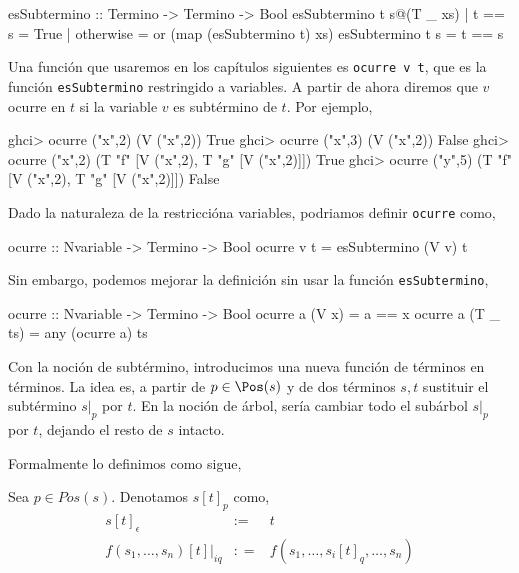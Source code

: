 \begin{codigo}
esSubtermino :: Termino -> Termino -> Bool
esSubtermino t s@(T _ xs)
    | t == s = True
    | otherwise = or (map (esSubtermino t) xs)
esSubtermino t s = t == s
\end{codigo}

Una función que usaremos en los capítulos siguientes es
\texttt{ocurre v t}, que es la función \texttt{esSubtermino}
restringido a variables. A partir de ahora diremos que $v$ ocurre en
$t$ si la variable $v$ es subtérmino de $t$. Por ejemplo,

\begin{sesion}
ghci> ocurre ("x",2) (V ("x",2)) 
True
ghci> ocurre ("x",3) (V ("x",2)) 
False
ghci> ocurre ("x",2) (T "f" [V ("x",2), T "g" [V ("x",2)]])
True
ghci> ocurre ("y",5) (T "f" [V ("x",2), T "g" [V ("x",2)]])
False
\end{sesion}

Dado la naturaleza de la restriccióna variables, podriamos definir
\texttt{ocurre} como,

\begin{codigo}
ocurre :: Nvariable -> Termino -> Bool
ocurre v t = esSubtermino (V v) t
\end{codigo}

Sin embargo, podemos mejorar la definición sin usar la función
\texttt{esSubtermino},

\begin{codigo}
ocurre :: Nvariable -> Termino -> Bool
ocurre a (V x)    = a == x
ocurre a (T _ ts) = any (ocurre a) ts
\end{codigo}

Con la noción de subtérmino, introducimos una nueva función de
términos en términos. La idea es, a partir de $p\in \Pos(s)$ y de dos
términos $s,t$ sustituir el subtérmino $s|_p$ por $t$. En la
noción de árbol, sería cambiar todo el subárbol $s|_p$ por $t$,
dejando el resto de $s$ intacto. 



Formalmente lo definimos como sigue,

\begin{defi}
Sea $p \in Pos(s)$. Denotamos $s[t]_p$ como,
  \begin{equation*}
    \begin{array}{rcl}
      s[t]_\epsilon & :=  & t \\
      f(s_1,\dots,s_n)[t]|_{iq} & : = & f(s_1,\dots,s_i[t]_q,\dots,s_n) \\
    \end{array}
  \end{equation*}
\end{defi}

